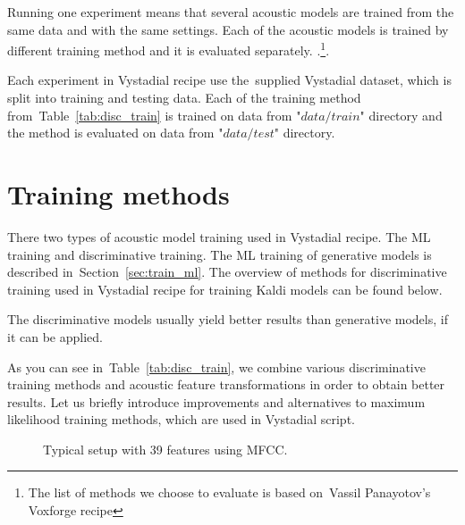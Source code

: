{Running one experiment means that several acoustic models are trained from the same data and with the same settings. 
Each of the acoustic models is trained by different training method and it is evaluated separately.
.\footnote{The list of methods we choose to evaluate is based on~Vassil Panayotov's Voxforge recipe}.

Each experiment in Vystadial recipe use the~supplied Vystadial dataset, which is split into training and testing data.
Each of the training method from~Table~\ref{tab:disc_train} is trained on data from "$data/train$" directory
and the method is evaluated on data from "$data/test$" directory.

\section{Training methods} 
\label{sec:methods}
There two types of acoustic model training used in Vystadial recipe. The \acl{ML} training and discriminative training.
The \ac{ML} training of generative models is described in~Section~\ref{sec:train_ml}.
The overview of methods for discriminative training used in Vystadial recipe for training Kaldi models
can be found below.

The discriminative models usually yield better results than generative models, if it can be applied. 


As you can see in~Table~\ref{tab:disc_train}, we combine various discriminative training methods
and acoustic feature transformations in order to obtain better results. 
Let us briefly introduce improvements and alternatives to maximum likelihood training methods,
which are used in Vystadial script.

\begin{figure}
    \begin{center}
    
    \caption{Typical setup with 39 features using \ac{MFCC}.}
    \label{fig:delta} 
    \end{center}
\end{figure}

}
